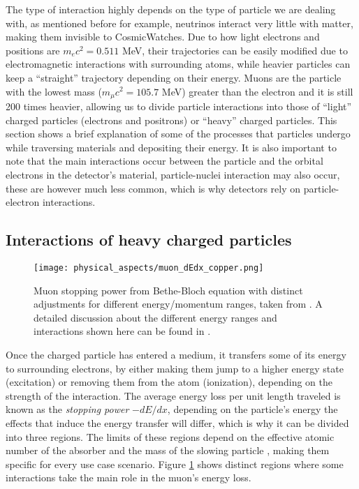 The type of interaction highly depends on the type of particle we are dealing with, as mentioned before for example, neutrinos interact very little with matter, making them invisible to CosmicWatches. Due to how light electrons and positions are $m_ec^2=0.511$ \unit{\mega\eV}, their trajectories can be easily modified due to electromagnetic interactions with surrounding atoms, while heavier particles can keep a ``straight'' trajectory depending on their energy. Muons are the particle with the lowest mass ($m_\mu c^2=105.7$  \unit{\mega\eV}) greater than the electron and it is still 200 times heavier, allowing us to divide particle interactions into those of ``light'' charged particles (electrons and positrons) or ``heavy'' charged particles. This section shows a brief explanation of some of the processes that particles undergo while traversing materials and depositing their energy. It is also important to note that the main interactions occur between the particle and the orbital electrons in the detector's material, particle-nuclei interaction may also occur, these are however much less common, which is why detectors rely on particle-electron interactions.

\subsection{Interactions of heavy charged particles}

\begin{figure}
  \centering
  \texttt{[image: physical\_aspects/muon\_dEdx\_copper.png]}
  \caption{\label{fig:muon_dEdx}Muon stopping power from Bethe-Bloch equation with distinct adjustments for different energy/momentum ranges, taken from \cite{muon_dEdx}. A detailed discussion about the different energy ranges and interactions shown here can be found in \cite[sec.~32]{ReviewOfParticlePhysics}.}
\end{figure}

Once the charged particle has entered a medium, it transfers some of its energy to surrounding electrons, by either making them jump to a higher energy state (excitation) or removing them from the atom (ionization), depending on the strength of the interaction. The average energy loss per unit length traveled is known as the \textit{stopping power} $-dE/dx$, depending on the particle's energy the effects that induce the energy transfer will differ, which is why it can be divided into three regions. The limits of these regions depend on the effective atomic number of the absorber and the mass of the slowing particle \cite{ReviewOfParticlePhysics}, making them specific for every use case scenario. Figure \ref{fig:muon_dEdx} shows distinct regions where some interactions take the main role in the muon's energy loss.

